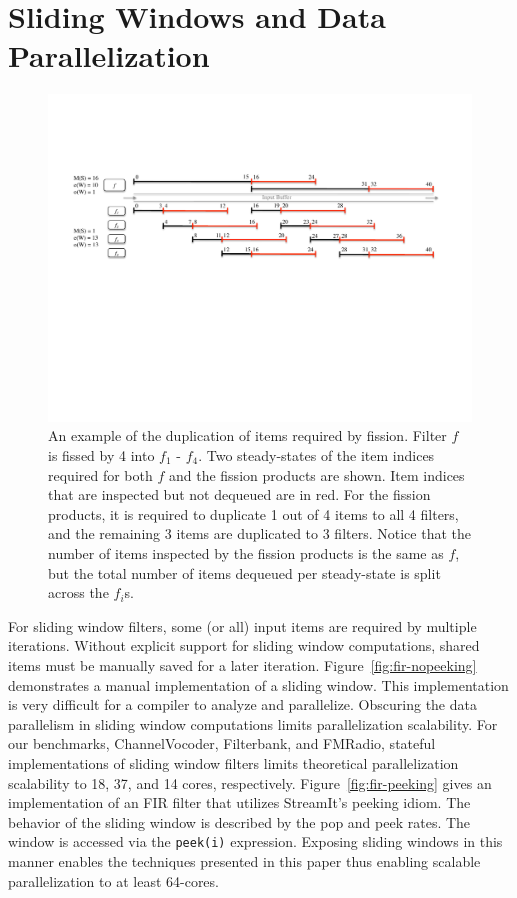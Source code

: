 \section{Sliding Windows and Data Parallelization}

\begin{figure}[t]
\centering
\includegraphics[width=6.0in]{figures/fission-sharing.pdf}
\caption[An example of the sharing required by fission.]  { An
  example of the duplication of items required by fission.  Filter $f$
  is fissed by 4 into $f_1$ - $f_4$.  Two steady-states of the item
  indices required for both $f$ and the fission products are shown.
  Item indices that are inspected but not dequeued are in red.  For the
  fission products, it is required to duplicate 1 out of 4 items to
  all 4 filters, and the remaining 3 items are duplicated to 3
  filters.  Notice that the number of items inspected by the fission
  products is the same as $f$, but the total number of items dequeued 
per steady-state is split across the $f_i$s.
\label{fig:fission-sharing}}
\end{figure}


For sliding window filters, some (or all) input items are required by
multiple iterations.  Without explicit support for sliding window
computations, shared items must be manually saved for a later
iteration.  Figure~\ref{fig:fir-nopeeking} demonstrates a manual
implementation of a sliding window.  This implementation is very
difficult for a compiler to analyze and parallelize.  Obscuring the
data parallelism in sliding window computations limits parallelization
scalability.  For our benchmarks, ChannelVocoder, Filterbank, and
FMRadio, stateful implementations of sliding window filters limits
theoretical parallelization scalability to 18, 37, and 14 cores, respectively.
Figure~\ref{fig:fir-peeking} gives an implementation of an FIR filter
that utilizes StreamIt's peeking idiom.  The behavior of the sliding
window is described by the pop and peek rates.  The window is accessed
via the {\tt peek(i)} expression.  Exposing sliding windows in this
manner enables the techniques presented in this paper thus enabling
scalable parallelization to at least 64-cores.

